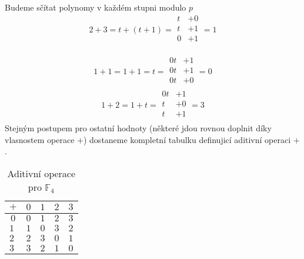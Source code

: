 \begin{example}
Budeme sčítat polynomy v každém stupni modulo $p$
\[
2 + 3 = t + (t + 1)
=
\begin{array}{rr}
    t & + 0\\
    t & + 1\\ \hline
    0 & + 1\\
      &
\end{array}
= 1
\]

\[
1 + 1 = 1 + 1 = t
=
\begin{array}{rr}
    0t & + 1\\
    0t & + 1\\ \hline
    0t & + 0\\
       &
\end{array}
= 0
\]
\[
    1 + 2 = 1 + t
=
\begin{array}{rr}
    0t & + 1\\
    t  & + 0\\ \hline
    t  & + 1\\
       &
\end{array}
= 3
\]
Stejným postupem pro ostatní hodnoty (některé jdou rovnou doplnit díky vlasnostem operace $+$)
dostaneme kompletní tabulku definujicí aditivní operaci $+$.

\begin{table}[h]
    \centering
    \begin{tabular}{|l|l|l|l|l|}
    \hline
    \multicolumn{1}{|c|}{$+$} & \multicolumn{1}{c|}{$0$} & \multicolumn{1}{c|}{$1$} & \multicolumn{1}{c|}{$2$} & \multicolumn{1}{c|}{$3$} \\ \hline
    \multicolumn{1}{|c|}{$0$} & \multicolumn{1}{c|}{$0$} & \multicolumn{1}{c|}{$1$} & \multicolumn{1}{c|}{$2$} & \multicolumn{1}{c|}{$3$} \\ \hline
    $1$                       & $1$                      & $0$                      & $3$                      & $2$                      \\ \hline
    $2$                       & $2$                      & $3$                      & $0$                      & $1$                      \\ \hline
    $3$                       & $3$                      & $2$                      & $1$                      & $0$                      \\ \hline
    \end{tabular}
    \caption{Aditivní operace pro $\mathbb{F}_{4}$}
    \label{tab:F4_plus}
    \end{table}

\end{example}

